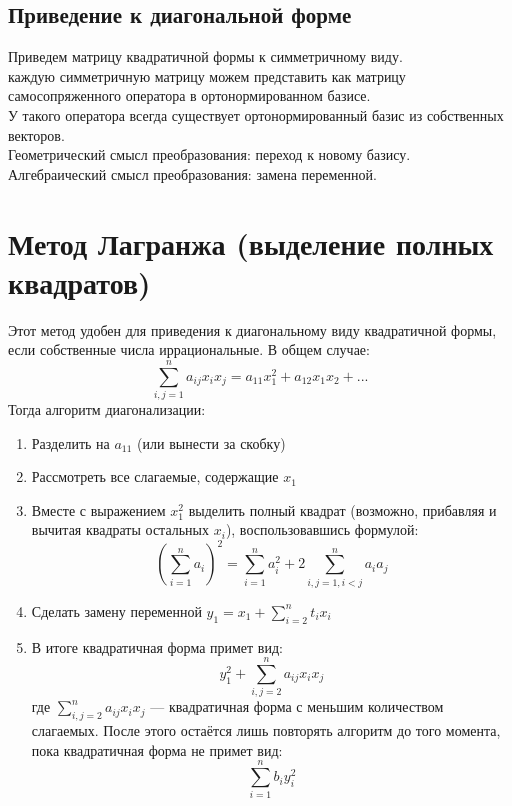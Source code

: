 \documentclass[12pt]{article}
\begin{document}
    \subsection{Приведение к диагональной форме}
    Приведем матрицу квадратичной формы к симметричному виду.\\
    каждую симметричную матрицу можем представить как матрицу самосопряженного оператора в ортонормированном базисе.\\
    У такого оператора всегда существует ортонормированный базис из собственных векторов.\\
    Геометрический смысл преобразования: переход к новому базису.\\
    Алгебраический смысл преобразования: замена переменной.\\


    \section{Метод Лагранжа (выделение полных квадратов)}
    Этот метод удобен для приведения к диагональному виду квадратичной формы, если собственные числа иррациональные. В общем случае:
    \[
        \sum_{i,j=1}^n a_{ij}x_ix_j = a_{11}x_1^2 + a_{12}x_1x_2 + ...
    \]
    Тогда алгоритм диагонализации:
    \begin{enumerate}
        \item Разделить на $a_{11}$ (или вынести за скобку)
        \item Рассмотреть все слагаемые, содержащие $x_1$
        \item Вместе с выражением $x_1^2$ выделить полный квадрат (возможно, прибавляя и вычитая квадраты остальных $x_i$), воспользовавшись формулой:
              \[
                  (\sum_{i = 1}^n a_i)^2 = \sum_{i = 1}^na_i^2 + 2\sum_{i,j=1, i<j}^na_ia_j
              \]
        \item Сделать замену переменной $\displaystyle y_1 = x_1 + \sum_{i=2}^nt_ix_i$
        \item В итоге квадратичная форма примет вид:
              \[
                  y_1^2 + \sum_{i,j=2}^na_{ij}x_ix_j
              \]
              где $\displaystyle \sum_{i,j=2}^na_{ij}x_ix_j$ — квадратичная форма с меньшим количеством слагаемых. После этого остаётся лишь повторять алгоритм до того момента, пока квадратичная форма не примет вид:
              \[
                  \sum_{i=1}^nb_iy_i^2
              \]
    \end{enumerate}
\end{document}
